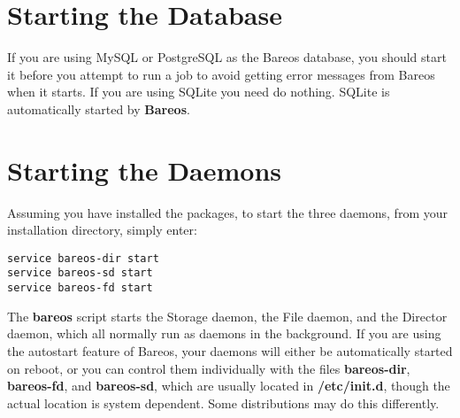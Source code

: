 % 

\section{Starting the Database}

If you are using MySQL or PostgreSQL as the Bareos database, you should start
it before you attempt to run a job to avoid getting error messages from Bareos
when it starts.
If you are using SQLite you need do nothing. SQLite is automatically
started by {\bf Bareos}.

\section{Starting the Daemons}
\label{StartDaemon}

Assuming you have installed the packages,
to start the three daemons, from your installation directory, simply enter:

\begin{verbatim}
service bareos-dir start
service bareos-sd start
service bareos-fd start
\end{verbatim}

The {\bf bareos} script starts the Storage daemon, the File daemon, and the
Director daemon, which all normally run as daemons in the background. If you
are using the autostart feature of Bareos, your daemons will either be
automatically started on reboot, or you can control them individually with the
files {\bf bareos-dir}, {\bf bareos-fd}, and {\bf bareos-sd}, which are
usually located in {\bf /etc/init.d}, though the actual location is system
dependent.
Some distributions may do this differently.

